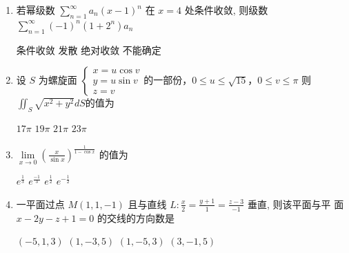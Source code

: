 \begin{enumerate}
\begin{enumerate}
\fourchoices
{$a=2, b=-1$}
{$a=2, b=-3$}
{$a=1, b=-3$}
{$a=1, b=-1$}

\item 
若幂级数 $\sum\limits_{n=1}^{\infty} a_{n}(x-1)^{n}$ 在 $x=4$ 处条件收敛, 则级数 $\sum\limits_{n=1}^{\infty}(-1)^{n}\left(1+2^{n}\right) a_{n}$  


\fourchoices
{条件收敛}
{发散}
{绝对收敛}
{不能确定}

\item 
设 $S$ 为螺旋面 $\left\{\begin{array}{l}x=u \cos v \\ y=u \sin v   \\ z=v\end{array} \right.$的一部份，$ 0\leq u \leq \sqrt{15} $，$ 0 \leq v \leq \pi $ 则 $\iint_{S} \sqrt{x^{2}+y^{2}} d S$的值为  


\fourchoices
{$17 \pi$}
{$19 \pi$}
{$21 \pi$}
{$23 \pi$}

\item 
$\lim\limits _{x \rightarrow 0}\left(\frac{x}{\sin x}\right)^{\frac{1}{1-\cos x}}$ 的值为  


\fourchoices
{$e^{\frac{1}{3}}$}
{$e^{\frac{-1}{3}}$}
{$e^{\frac{1}{2}}$}
{$e^{-\frac{1}{2}}$}


\item 
一平面过点 $M(1,1,-1)$ 且与直线 $L: \frac{x}{2}=\frac{y+1}{1}=\frac{z-3}{-1}$ 垂直, 则该平面与平 面 $x-2 y-z+1=0$ 的交线的方向数是  


\fourchoices
{$(-5,1,3)$}
{$(1,-3,5)$}
{$(1,-5,3)$}
{$(3,-1,5)$}




	\end{enumerate}


\end{enumerate}
